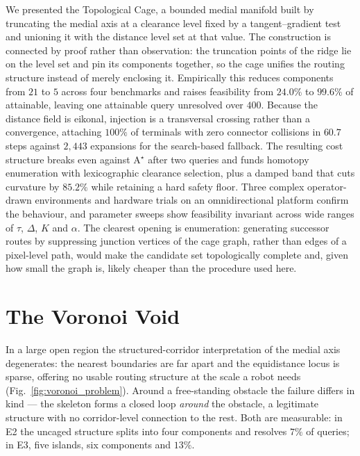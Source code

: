 \documentclass[conference]{IEEEtran}
\begin{document}
We presented the Topological Cage, a bounded medial manifold built by truncating the medial axis at a clearance level fixed by a tangent--gradient test and unioning it with the distance level set at that value. The construction is connected by proof rather than observation: the truncation points of the ridge lie on the level set and pin its components together, so the cage unifies the routing structure instead of merely enclosing it. Empirically this reduces components from $21$ to $5$ across four benchmarks and raises feasibility from $24.0\%$ to $99.6\%$ of attainable, leaving one attainable query unresolved over $400$. Because the distance field is eikonal, injection is a transversal crossing rather than a convergence, attaching $100\%$ of terminals with zero connector collisions in $60.7$ steps against $2{,}443$ expansions for the search-based fallback. The resulting cost structure breaks even against A$^\star$ after two queries and funds homotopy enumeration with lexicographic clearance selection, plus a damped band that cuts curvature by $85.2\%$ while retaining a hard safety floor. Three complex operator-drawn environments and hardware trials on an omnidirectional platform confirm the behaviour, and parameter sweeps show feasibility invariant across wide ranges of $\tau$, $\Delta$, $K$ and $\alpha$. The clearest opening is enumeration: generating successor routes by suppressing junction vertices of the cage graph, rather than edges of a pixel-level path, would make the candidate set topologically complete and, given how small the graph is, likely cheaper than the procedure used here.

\appendices
\section{The Voronoi Void}
\label{appendix:voronoi_void}

In a large open region the structured-corridor interpretation of the medial axis degenerates: the nearest boundaries are far apart and the equidistance locus is sparse, offering no usable routing structure at the scale a robot needs (Fig.~\ref{fig:voronoi_problem}). Around a free-standing obstacle the failure differs in kind --- the skeleton forms a closed loop \emph{around} the obstacle, a legitimate structure with no corridor-level connection to the rest. Both are measurable: in E2 the uncaged structure splits into four components and resolves $7\%$ of queries; in E3, five islands, six components and $13\%$.
\end{document}

